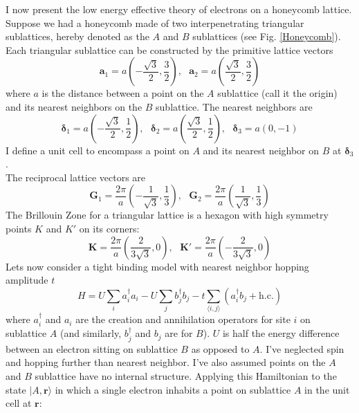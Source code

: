 \documentclass[a4paper,12pt]{article}
\renewcommand{\vec}[1]{\boldsymbol{\mathbf{#1}}}
\begin{document}
I now present the low energy effective theory of electrons on a honeycomb lattice.  Suppose we had a honeycomb made of two interpenetrating triangular sublattices, hereby denoted as the $A$ and $B$ sublattices (see Fig. \ref{Honeycomb}).  Each triangular sublattice can be constructed by the primitive lattice vectors
\begin{equation}
\vec{a}_1 = a \left( -\frac{\sqrt{3}}{2}, \frac{3}{2} \right), \text{ }
\vec{a}_2 = a \left( \frac{\sqrt{3}}{2}, \frac{3}{2} \right)
\end{equation}
where $a$ is the distance between a point on the $A$ sublattice (call it the origin) and its nearest neighbors on the $B$ sublattice.  The nearest neighbors are
\begin{equation}
\vec{\delta}_1 = a \left( -\frac{\sqrt{3}}{2}, \frac{1}{2} \right), \text{ }
\vec{\delta}_2 = a \left( \frac{\sqrt{3}}{2}, \frac{1}{2} \right), \text{ }
\vec{\delta}_3 = a \left( 0, -1 \right)
\end{equation}
I define a unit cell to encompass a point on $A$ and its nearest neighbor on $B$ at $\vec{\delta}_3$. \\
The reciprocal lattice vectors are
\begin{equation}
\vec{G}_1 = \frac{2 \pi}{a} \left( -\frac{1}{\sqrt{3}}, \frac{1}{3} \right), \text{ }
\vec{G}_2 = \frac{2 \pi}{a} \left( \frac{1}{\sqrt{3}}, \frac{1}{3} \right)
\end{equation}
The Brillouin Zone for a triangular lattice is a hexagon with high symmetry points $K$ and $K'$ on its corners:
\begin{equation}
\vec{K} = \frac{2 \pi}{a} \left(\frac{2}{3 \sqrt{3}}, 0 \right), \text{ }
\vec{K}' = \frac{2 \pi}{a} \left( -\frac{2}{3 \sqrt{3}}, 0 \right)
\end{equation}
Lets now consider a tight binding model with nearest neighbor hopping amplitude $t$
\begin{equation}
H= U \sum_i a_i^\dagger a_i- U \sum_j b_j^\dagger b_j - t \sum_{\langle i,j \rangle} \left( a_i^\dagger b_j + \text{h.c.} \right)
\end{equation}
where $a_i^\dagger$ and $a_i$ are the creation and annihilation operators for site $i$ on sublattice $A$ (and similarly, $b_j^\dagger$ and $b_j$ are for $B$).  $U$ is half the energy difference between an electron sitting on sublattice $B$ as opposed to $A$.  I've neglected spin and hopping further than nearest neighbor.  I've also assumed points on the $A$ and $B$ sublattice have no internal structure.
Applying this Hamiltonian to the state $|A,\vec{r} \rangle$ in which a single electron inhabits a point on sublattice $A$ in the unit cell at $\vec{r}$:
\end{document}
